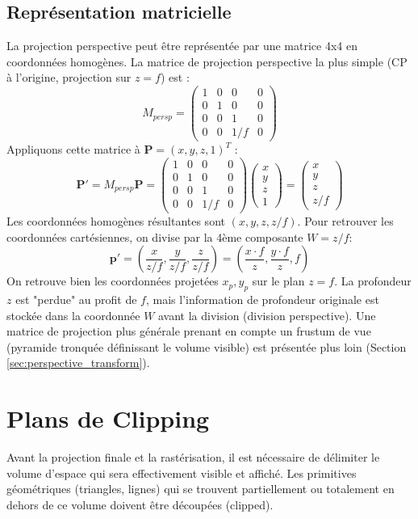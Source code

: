 \subsection{Représentation matricielle}
La projection perspective peut être représentée par une matrice 4x4 en coordonnées homogènes. La matrice de projection perspective la plus simple (CP à l'origine, projection sur \( z=f \)) est :
\[ M_{persp} = \begin{pmatrix} 1 & 0 & 0 & 0 \\ 0 & 1 & 0 & 0 \\ 0 & 0 & 1 & 0 \\ 0 & 0 & 1/f & 0 \end{pmatrix} \]
Appliquons cette matrice à \( \mathbf{P} = (x, y, z, 1)^T \) :
\[ \mathbf{P'} = M_{persp} \mathbf{P} = \begin{pmatrix} 1 & 0 & 0 & 0 \\ 0 & 1 & 0 & 0 \\ 0 & 0 & 1 & 0 \\ 0 & 0 & 1/f & 0 \end{pmatrix} \begin{pmatrix} x \\ y \\ z \\ 1 \end{pmatrix} = \begin{pmatrix} x \\ y \\ z \\ z/f \end{pmatrix} \]
Les coordonnées homogènes résultantes sont \( (x, y, z, z/f) \). Pour retrouver les coordonnées cartésiennes, on divise par la 4ème composante \( W = z/f \):
\[ \mathbf{p'} = \left( \frac{x}{z/f}, \frac{y}{z/f}, \frac{z}{z/f} \right) = \left( \frac{x \cdot f}{z}, \frac{y \cdot f}{z}, f \right) \]
On retrouve bien les coordonnées projetées \( x_p, y_p \) sur le plan \( z=f \). La profondeur \( z \) est "perdue" au profit de \( f \), mais l'information de profondeur originale est stockée dans la coordonnée \( W \) avant la division (division perspective).
Une matrice de projection plus générale prenant en compte un frustum de vue (pyramide tronquée définissant le volume visible) est présentée plus loin (Section \ref{sec:perspective_transform}).
\section{Plans de Clipping}
Avant la projection finale et la rastérisation, il est nécessaire de délimiter le volume d'espace qui sera effectivement visible et affiché. Les primitives géométriques (triangles, lignes) qui se trouvent partiellement ou totalement en dehors de ce volume doivent être découpées (clipped).
